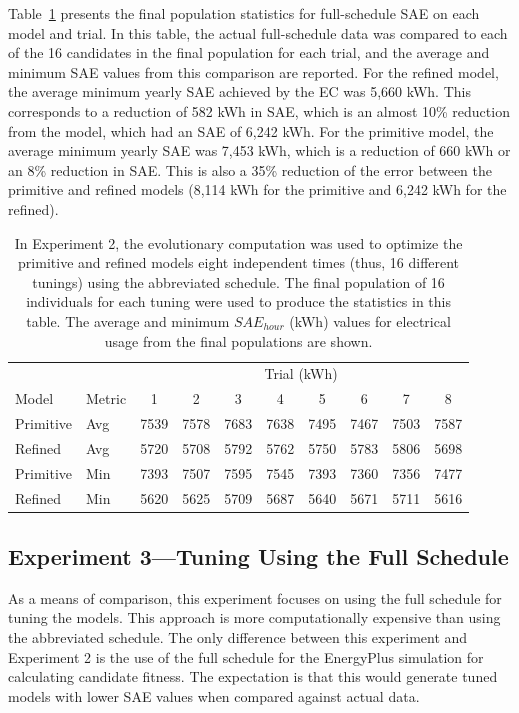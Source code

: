 \documentclass[preprint, review, 12pt]{elsarticle}
\begin{document}
Table~\ref{tab:hourly-abbrev} presents the final population statistics for full-schedule SAE on each model and trial. In this table, the actual full-schedule data was compared to each of the 16 candidates in the final population for each trial, and the average and minimum SAE values from this comparison are reported. For the refined model, the average minimum yearly SAE achieved by the EC was 5,660 kWh. This corresponds to a reduction of 582 kWh in SAE, which is an almost 10\% reduction from the model, which had an SAE of 6,242 kWh. For the primitive model, the average minimum yearly SAE was 7,453 kWh, which is a reduction of 660 kWh or an 8\% reduction in SAE. This is also a 35\% reduction of the error between the primitive and refined models (8,114 kWh for the primitive and 6,242 kWh for the refined).


\begin{table}[tbp]
\centering
\caption{In Experiment 2, the evolutionary computation was used to optimize the primitive and refined models eight independent times (thus, 16 different tunings) using the abbreviated schedule. The final population of 16 individuals for each tuning were used to produce the statistics in this table. The average and minimum $SAE_{hour}$ (kWh) values for electrical usage from the final populations are shown.}
\label{tab:hourly-abbrev}
\begin{tabular}{llcccccccc}
\toprule
 &  & \multicolumn{8}{c}{Trial (kWh)}\\
Model & Metric & 1 & 2 & 3 & 4 & 5 & 6 & 7 & 8\\
\midrule
Primitive & Avg & 7539 & 7578 & 7683 & 7638 & 7495 & 7467 & 7503 & 7587\\\rowcolor{DarkRow}
Refined   & Avg & 5720 & 5708 & 5792 & 5762 & 5750 & 5783 & 5806 & 5698\\
Primitive & Min & 7393 & 7507 & 7595 & 7545 & 7393 & 7360 & 7356 & 7477\\\rowcolor{DarkRow}
Refined   & Min & 5620 & 5625 & 5709 & 5687 & 5640 & 5671 & 5711 & 5616\\
\bottomrule
\end{tabular}
\end{table}


\subsection{Experiment 3---Tuning Using the Full Schedule}
\label{sub:experiment3}
As a means of comparison, this experiment focuses on using the full schedule for tuning the models. This approach is more computationally expensive than using the abbreviated schedule. The only difference between this experiment and Experiment 2 is the use of the full schedule for the EnergyPlus simulation for calculating candidate fitness. The expectation is that this would generate tuned models with lower SAE values when compared against actual data.
\end{document}
